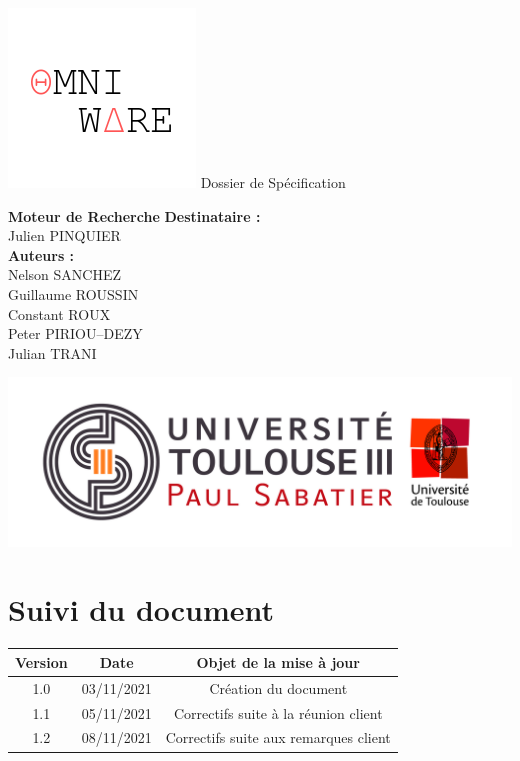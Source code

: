 \documentclass[12pt]{article}
\begin{document}
\begin{titlepage}
    \begin{center}
        \includegraphics[scale=1]{./assets/logo_omniware.PNG}
        \vfill
        \Huge
        Dossier de Spécification

        \HUGE
        \textbf{Moteur de Recherche}
        \vfill
        \normalsize
        \textbf{Destinataire : }\\ 
        Julien PINQUIER\\
        \vspace{1cm}
        \textbf{Auteurs : }\\ 
        Nelson SANCHEZ\\ 
        Guillaume ROUSSIN\\ 
        Constant ROUX\\ 
        Peter PIRIOU--DEZY\\
        Julian TRANI\par
        \vfill
        \includegraphics[scale=0.5]{./assets/logo_ut3.jpg}
    \end{center}
\end{titlepage}
\begin{titlepage}
\end{titlepage}

\newpage

\section{Suivi du document}
\vspace{0.5cm}
\begin{center}
    \begin{tabular}{|c|c|c|}
        \hline
        \rowcolor{Gray}Version & Date & Objet de la mise à jour \\
        \hline
        1.0 & 03/11/2021 & Création du document \\
        1.1 & 05/11/2021 & Correctifs suite à la réunion client \\
        1.2 & 08/11/2021 & Correctifs suite aux remarques client \\
        \hline
      \end{tabular}
\end{center}

\newpage
\tableofcontents
\listoffigures
\newpage


\newpage


\newpage


\newpage


\newpage
\end{document}

